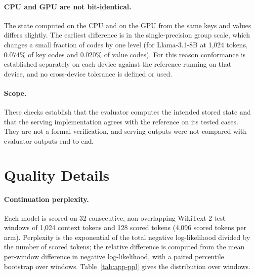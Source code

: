 \documentclass{article}
\begin{document}
\paragraph{CPU and GPU are not bit-identical.}
The state computed on the CPU and on the GPU from the same keys and values differs slightly. The
earliest difference is in the single-precision group scale, which changes a small fraction of codes by
one level (for Llama-3.1-8B at 1,024 tokens, 0.074\% of key codes and 0.020\% of value codes). For this
reason conformance is established separately on each device against the reference running on that
device, and no cross-device tolerance is defined or used.

\paragraph{Scope.}
These checks establish that the evaluator computes the intended stored state and that the serving
implementation agrees with the reference on its tested cases. They are not a formal verification, and
serving outputs were not compared with evaluator outputs end to end.

\section{Quality Details}
\label{app:quality}

\paragraph{Continuation perplexity.}
Each model is scored on 32 consecutive, non-overlapping WikiText-2 test windows of 1,024 context tokens
and 128 scored tokens (4,096 scored tokens per arm). Perplexity is the exponential of the total
negative log-likelihood divided by the number of scored tokens; the relative difference is computed
from the mean per-window difference in negative log-likelihood, with a paired percentile bootstrap
over windows. Table~\ref{tab:app-ppl} gives the distribution over windows.
\end{document}
